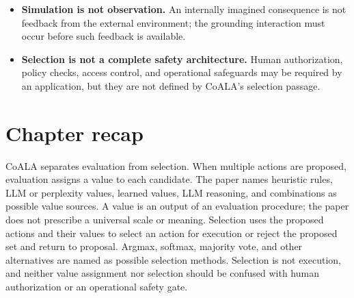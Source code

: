 \begin{itemize}
  \item \textbf{Simulation is not observation.} An internally imagined consequence is not feedback from the external environment; the grounding interaction must occur before such feedback is available.
  \item \textbf{Selection is not a complete safety architecture.} Human authorization, policy checks, access control, and operational safeguards may be required by an application, but they are not defined by CoALA's selection passage.
\end{itemize}

\section{Chapter recap}
\label{sec:evaluation-recap}

\begin{chapterrecap}
CoALA separates evaluation from selection. When multiple actions are proposed, evaluation assigns a value to each candidate. The paper names heuristic rules, LLM or perplexity values, learned values, LLM reasoning, and combinations as possible value sources. A value is an output of an evaluation procedure; the paper does not prescribe a universal scale or meaning. Selection uses the proposed actions and their values to select an action for execution or reject the proposed set and return to proposal. Argmax, softmax, majority vote, and other alternatives are named as possible selection methods. Selection is not execution, and neither value assignment nor selection should be confused with human authorization or an operational safety gate.
\end{chapterrecap}

